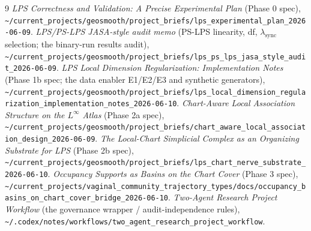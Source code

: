 \documentclass[11pt]{article}
\begin{document}
\begin{thebibliography}{9}\small
{} \emph{LPS Correctness and Validation: A Precise Experimental Plan}
  (Phase 0 spec),
  \nolinkurl{~/current_projects/geosmooth/project_briefs/lps_experimental_plan_2026-06-09}.
 \emph{LPS/PS-LPS JASA-style audit memo} (PS-LPS linearity, df,
  $\lambda_{\mathrm{sync}}$ selection; the binary-run results audit),
  \nolinkurl{~/current_projects/geosmooth/project_briefs/lps_ps_lps_jasa_style_audit_2026-06-09}.
 \emph{LPS Local Dimension Regularization: Implementation Notes}
  (Phase 1b spec; the data enabler E1/E2/E3 and synthetic generators),
  \nolinkurl{~/current_projects/geosmooth/project_briefs/lps_local_dimension_regularization_implementation_notes_2026-06-10}.
 \emph{Chart-Aware Local Association Structure on the
  $L^\infty$ Atlas} (Phase 2a spec),
  \nolinkurl{~/current_projects/geosmooth/project_briefs/chart_aware_local_association_design_2026-06-09}.
 \emph{The Local-Chart Simplicial Complex as an Organizing Substrate
  for LPS} (Phase 2b spec),
  \nolinkurl{~/current_projects/geosmooth/project_briefs/lps_chart_nerve_substrate_2026-06-10}.
 \emph{Occupancy Supports as Basins on the Chart Cover} (Phase 3
  spec),
  \nolinkurl{~/current_projects/vaginal_community_trajectory_types/docs/occupancy_basins_on_chart_cover_bridge_2026-06-10}.
 \emph{Two-Agent Research Project Workflow} (the governance
  wrapper / audit-independence rules),
  \nolinkurl{~/.codex/notes/workflows/two_agent_research_project_workflow}.
\end{thebibliography}
\end{document}
